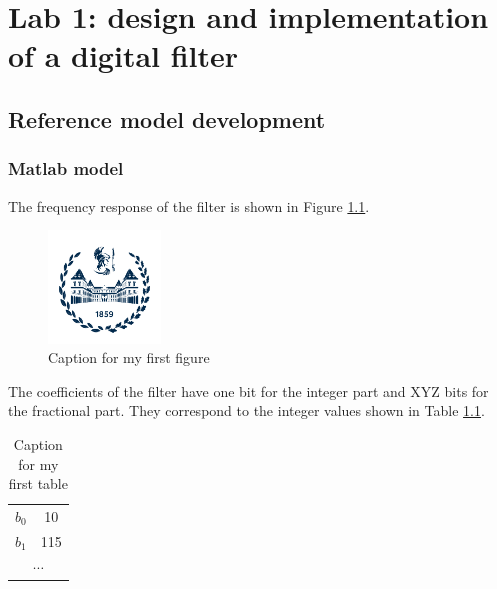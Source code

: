 \chapter{Lab 1: design and implementation of a digital filter}



\section{Reference model development}

\subsection{Matlab model}

The frequency response of the filter is shown in Figure \ref{fig:lab1:fig1}.

\begin{figure}[h]
  \centering
  \includegraphics[width=3cm]{./logopoli_new}
  \caption{Caption for my first figure}
  \label{fig:lab1:fig1}
\end{figure}

The coefficients of the filter have one bit for the integer part and XYZ bits for the fractional part. They correspond to the integer values shown in Table \ref{tab:cap1:tab1}.

\begin{table}
  \centering
  \caption{Caption for my first table}
  \label{tab:cap1:tab1}  
  \begin{tabular}{c|c}
    $b_0$ & 10 \\
    $b_1$ & 115 \\
    \multicolumn{2}{c}{$\cdots$} \\
  \end{tabular}
\end{table}

